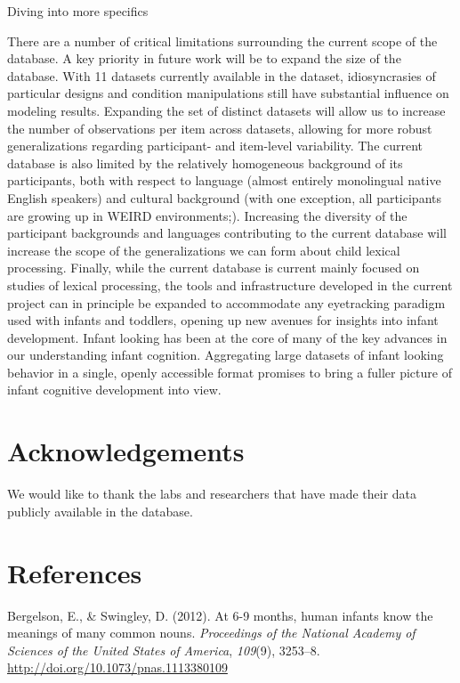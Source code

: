 \documentclass[10pt, letterpaper]{article}
\begin{document}
Diving into more specifics

There are a number of critical limitations surrounding the current scope
of the database. A key priority in future work will be to expand the
size of the database. With 11 datasets currently available in the
dataset, idiosyncrasies of particular designs and condition
manipulations still have substantial influence on modeling results.
Expanding the set of distinct datasets will allow us to increase the
number of observations per item across datasets, allowing for more
robust generalizations regarding participant- and item-level
variability. The current database is also limited by the relatively
homogeneous background of its participants, both with respect to
language (almost entirely monolingual native English speakers) and
cultural background (with one exception, all participants are growing up
in WEIRD environments;). Increasing the diversity of the participant
backgrounds and languages contributing to the current database will
increase the scope of the generalizations we can form about child
lexical processing. Finally, while the current database is current
mainly focused on studies of lexical processing, the tools and
infrastructure developed in the current project can in principle be
expanded to accommodate any eyetracking paradigm used with infants and
toddlers, opening up new avenues for insights into infant development.
Infant looking has been at the core of many of the key advances in our
understanding infant cognition. Aggregating large datasets of infant
looking behavior in a single, openly accessible format promises to bring
a fuller picture of infant cognitive development into view.

\hypertarget{acknowledgements}{%
\section{Acknowledgements}\label{acknowledgements}}

We would like to thank the labs and researchers that have made their
data publicly available in the database.

\hypertarget{references}{%
\section{References}\label{references}}

\setlength{\parindent}{-0.1in} 
\setlength{\leftskip}{0.125in}

\noindent

\hypertarget{refs}{}
\leavevmode\hypertarget{ref-Bergelson2012a}{}%
Bergelson, E., \& Swingley, D. (2012). At 6-9 months, human infants know
the meanings of many common nouns. \emph{Proceedings of the National
Academy of Sciences of the United States of America}, \emph{109}(9),
3253--8. \url{http://doi.org/10.1073/pnas.1113380109}
\end{document}
